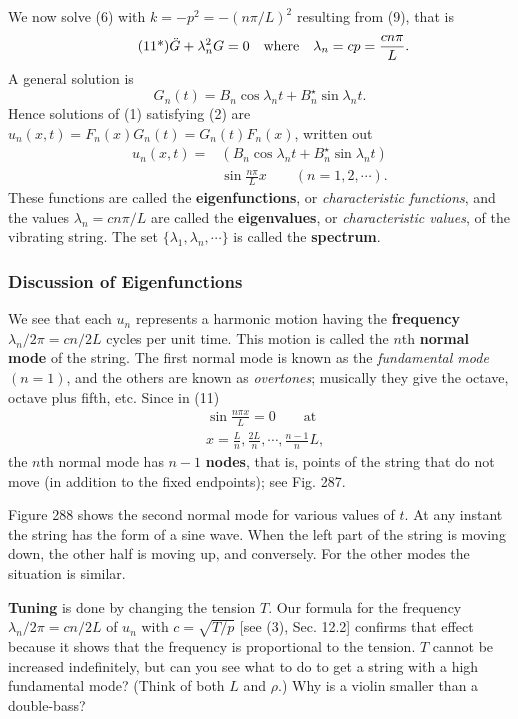 \documentclass[twocolumn, 12pt, leqno, oneside]{amsart}
\begin{document}
We now solve (6) with \newline $k=-p^2=-(n\pi/L)^2$ resulting from (9), that is
\begin{equation}
  \tag{11*}
    \ddot{G}+\lambda_n^2G=0 \quad \text{where} \quad \lambda_n=cp= \\
        \frac{cn\pi}{L}.
\end{equation}
A general solution is
\begin{equation}
  \nonumber
    G_n(t)=B_n\cos{\lambda_n t} + B_n^\star\sin{\lambda_n t}.
\end{equation}
Hence solutions of (1) satisfying (2) are 
$u_n(x,t)=F_n(x)G_n(t)=G_n(t)F_n(x)$, written out
\begin{equation}
  \begin{split}
      u_n(x,t)=&(B_n\cos{\lambda_n t} + B_n^\star\sin{\lambda_n t}) \\
        &\sin{\frac{n\pi}{L} x} \quad \quad (n=1,2,\dotsb).
  \end{split}
\end{equation}
These functions are called the \textbf{eigenfunctions}, or 
\emph{characteristic functions}, and the values $\lambda_n=cn\pi/L$ are called 
the \textbf{eigenvalues}, or \emph{characteristic values}, of the vibrating 
string. The set $\{\lambda_1,\lambda_n,\dotsb\}$ is called the 
\textbf{spectrum}.

\subsubsection{Discussion of Eigenfunctions}

We see that each $u_n$ represents a harmonic motion having the 
\textbf{frequency} $\lambda_n/2\pi=cn/2L$ cycles per unit time. This motion is 
called the $n$th \textbf{normal mode} of the string. The first normal mode is 
known as the \emph{fundamental mode} $(n=1)$, and the others are known as 
\emph{overtones}; musically they give the octave, octave plus fifth, etc. 
Since in (11)
\begin{equation}
  \nonumber
  \begin{split}
      &\sin{\frac{n\pi x}{L}}=0 \qquad \text{at} \\
      & x=\frac{L}{n}, \frac{2L}{n},\dotsb,\frac{n-1}{n}L,
  \end{split}
\end{equation}
the $n$th normal mode has $n-1$ \textbf{nodes}, that is, points of the string 
that do not move (in addition to the fixed endpoints); see Fig. 287.

Figure 288 shows the second normal mode for various values of $t$. At any 
instant the string has the form of a sine wave. When the left part of the 
string is moving down, the other half is moving up, and conversely. For the 
other modes the situation is similar.

\textbf{Tuning} is done by changing the tension $T$. Our formula for the 
frequency $\lambda_n/2\pi=cn/2L$ of $u_n$  with $c=\sqrt{T/p}$ [see (3), Sec. 
12.2] confirms that effect because it shows that the frequency is proportional 
to the tension. $T$ cannot be increased indefinitely, but can you see what to 
do to get a string with a high fundamental mode? (Think of both $L$ and 
$\rho$.) Why is a violin smaller than a double-bass?
\end{document}
